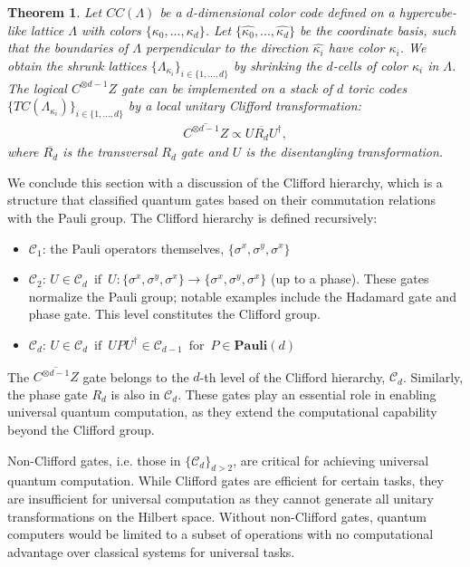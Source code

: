 \documentclass[12pt]{article}
\newtheorem{theorem}{Theorem}[section]
\theoremstyle{definition}
\begin{document}
    \begin{theorem}
        Let $CC(\Lambda)$ be a $d$-dimensional color code defined on a hypercube-like lattice $\Lambda$ with colors $\{\kappa_0,...,\kappa_{d}\}$. Let $\{\hat{\kappa_0},...,\hat{\kappa_{d}}\}$ be the coordinate basis, such that the boundaries of $\Lambda$ perpendicular to the direction $\hat{\kappa_i}$ have color $\kappa_i$. We obtain the shrunk lattices $\{\Lambda_{\kappa_i}\}_{i\in\{1,...,d\}}$ by shrinking the $d$-cells of color $\kappa_i$ in $\Lambda$. The logical $C^{\otimes d-1}Z$ gate can be implemented on a stack of $d$ toric codes $\{TC(\Lambda_{\kappa_i})\}_{i\in\{1,...,d\}}$ by a local unitary Clifford transformation:
            \begin{align}
                \overline{C^{\otimes d-1}Z} \propto U\overline{R_d}U^\dagger,
            \end{align}
        where $\overline{R_d}$ is the transversal $R_d$ gate and $U$ is the disentangling transformation. 
    \end{theorem}

We conclude this section with a discussion of the Clifford hierarchy, which is a structure that classified quantum gates based on their commutation relations with the Pauli group. The Clifford hierarchy is defined recursively:
    \begin{itemize}
        \item \textbf{$\mathcal{C}_1$}: the Pauli operators themselves, $\{\sigma^x,\sigma^y,\sigma^x\}$
        \item \textbf{$\mathcal{C}_2$}: $U\in\mathcal{C}_d\enspace\text{if}\enspace U:\{\sigma^x,\sigma^y,\sigma^x\}\rightarrow\{\sigma^x,\sigma^y,\sigma^x\}$ (up to a phase). These gates normalize the Pauli group; notable examples include the Hadamard gate and phase gate. This level constitutes the Clifford group.
        \item \textbf{$\mathcal{C}_d$}: $U\in\mathcal{C}_d\enspace\text{if}\enspace UPU^\dagger\in\mathcal{C}_{d-1}\enspace\text{for}\enspace P\in\textbf{Pauli}(d)$
    \end{itemize}
The $\overline{C^{\otimes d-1}Z}$ gate belongs to the $d$-th level of the Clifford hierarchy, $\mathcal{C}_d$. Similarly, the phase gate $R_d$ is also in $\mathcal{C}_d$. These gates play an essential role in enabling universal quantum computation, as they extend the computational capability beyond the Clifford group.\newline

Non-Clifford gates, i.e. those in $\{\mathcal{C}_d\}_{d>2}$, are critical for achieving universal quantum computation. While Clifford gates are efficient for certain tasks, they are insufficient for universal computation as they cannot generate all unitary transformations on the Hilbert space. Without non-Clifford gates, quantum computers would be limited to a subset of operations with no computational advantage over classical systems for universal tasks.
\end{document}
